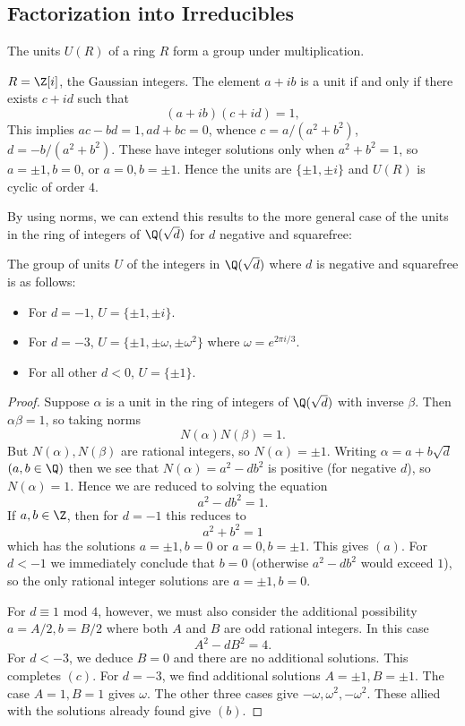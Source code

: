 \subsection{Factorization into Irreducibles}
\begin{proposition}
The units $U(R)$ of a ring $R$ form a group under multiplication.
\end{proposition}
\begin{example}
$R=\Z[i]$, the Gaussian integers. The element $a+ib$ is a unit if and only if there exists $c+id$ such that
\[(a+ib)(c+id)=1,\]
This implies $ac-bd=1,ad+bc=0$, whence $c=a/(a^2+b^2)$, $d=-b/(a^2+b^2)$. These have integer solutions only when $a^2+b^2=1$, so $a=\pm 1,b=0$, or $a=0,b=\pm1$. Hence the units are $\{\pm1,\pm i\}$ and $U(R)$ is cyclic of order $4$.
\end{example}
By using norms, we can extend this results to the more general case of the units in the ring of integers of $\Q(\sqrt{d})$ for $d$ negative and squarefree:
\begin{proposition}
The group of units $U$ of the integers in $\Q(\sqrt{d})$ where $d$ is negative and squarefree is as follows:
\begin{itemize}
\item For $d=-1$, $U=\{\pm1,\pm i\}$.
\item For $d=-3$, $U=\{\pm1,\pm\omega,\pm\omega^2\}$ where $\omega=e^{2\pi i/3}$.
\item For all other $d<0$, $U=\{\pm1\}$.
\end{itemize}
\end{proposition}
\begin{proof}
Suppose $\alpha$ is a unit in the ring of integers of $\Q(\sqrt{d})$ with inverse $\beta$. Then $\alpha\beta=1$, so taking norms
\[N(\alpha)N(\beta)=1.\]
But $N(\alpha),N(\beta)$ are rational integers, so $N(\alpha)=\pm1$. Writing $\alpha=a+b\sqrt{d}$ $(a,b\in\Q)$ then we see that $N(\alpha)=a^2-db^2$ is positive (for negative $d$), so $N(\alpha)=1$. Hence we are reduced to solving the equation
\[a^2-db^2=1.\]
If $a,b\in\Z$, then for $d=-1$ this reduces to
\[a^2+b^2=1\]
which has the solutions $a=\pm 1,b=0$ or $a=0,b=\pm1$. This gives $(a)$. For $d<-1$ we immediately conclude that $b=0$ (otherwise $a^2-db^2$ would exceed $1$), so the only rational integer solutions are $a=\pm1,b=0$.\par
For $d\equiv1$ mod $4$, however, we must also consider the additional possibility $a=A/2,b=B/2$ where both $A$ and $B$ are odd rational integers. In this case
\[A^2-dB^2=4.\]
For $d<-3$, we deduce $B=0$ and there are no additional solutions. This completes $(c)$. For $d=-3$, we find additional solutions $A=\pm1,B=\pm1$. The case $A=1,B=1$ gives $\omega$. The other three cases give $-\omega,\omega^2,-\omega^2$. These allied with the solutions already found give $(b)$.
\end{proof}
